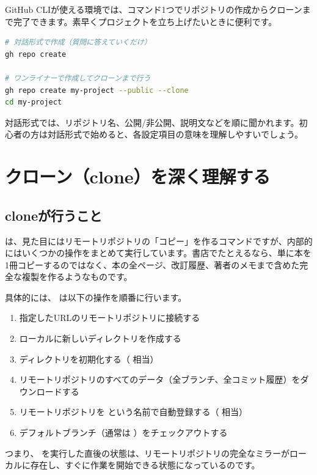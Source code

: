 GitHub CLIが使える環境では、コマンド1つでリポジトリの作成からクローンまで完了できます。素早くプロジェクトを立ち上げたいときに便利です。

\begin{lstlisting}[language=bash]
# 対話形式で作成（質問に答えていくだけ）
gh repo create

# ワンライナーで作成してクローンまで行う
gh repo create my-project --public --clone
cd my-project
\end{lstlisting}

対話形式では、リポジトリ名、公開/非公開、説明文などを順に聞かれます。初心者の方は対話形式で始めると、各設定項目の意味を理解しやすいでしょう。

\section{クローン（clone）を深く理解する}

\subsection{cloneが行うこと}

 は、見た目にはリモートリポジトリの「コピー」を作るコマンドですが、内部的にはいくつかの操作をまとめて実行しています。書店でたとえるなら、単に本を1冊コピーするのではなく、本の全ページ、改訂履歴、著者のメモまで含めた完全な複製を作るようなものです。

具体的には、 は以下の操作を順番に行います。

\begin{enumerate}
  \item 指定したURLのリモートリポジトリに接続する
  \item ローカルに新しいディレクトリを作成する
  \item {} ディレクトリを初期化する（ 相当）
  \item リモートリポジトリのすべてのデータ（全ブランチ、全コミット履歴）をダウンロードする
  \item リモートリポジトリを  という名前で自動登録する（ 相当）
  \item デフォルトブランチ（通常は ）をチェックアウトする
\end{enumerate}

つまり、 を実行した直後の状態は、リモートリポジトリの完全なミラーがローカルに存在し、すぐに作業を開始できる状態になっているのです。

